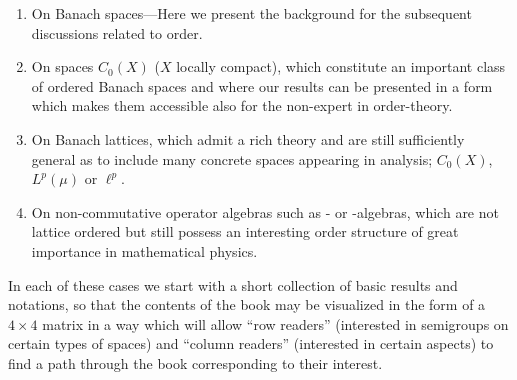 \begin{enumerate}[label=Part-\Alph*, align=left]
 \item 
 On Banach spaces---Here we present the background for the subsequent discussions related to order.
 
 \item 
 On spaces $C_{0}(X)$ ($X$ locally compact), which constitute an important class of ordered Banach spaces and where our results can be presented in a form which makes them accessible also for the non-expert in order-theory.
 
 \item 
 On Banach lattices, which admit a rich theory and are still sufficiently general as to include many concrete spaces appearing in analysis; \eg $C_0(X)$, $L^{p}(\mu)$ or $\ell^{p}$.
 
 \item 
 On non-commutative operator algebras such as \CA- or \WA-algebras, which are not lattice ordered but still possess an interesting order structure of great importance in mathematical physics.
 
 \end{enumerate}
 In each of these cases we start with a short collection of basic results and notations, so that the contents of the book may be visualized in the form of a $4 \times 4$ matrix in a way which will allow \enquote{row readers} (interested in semigroups on certain types of spaces) and \enquote{column readers} (interested in certain aspects) to find a path through the book corresponding to their interest.
 
